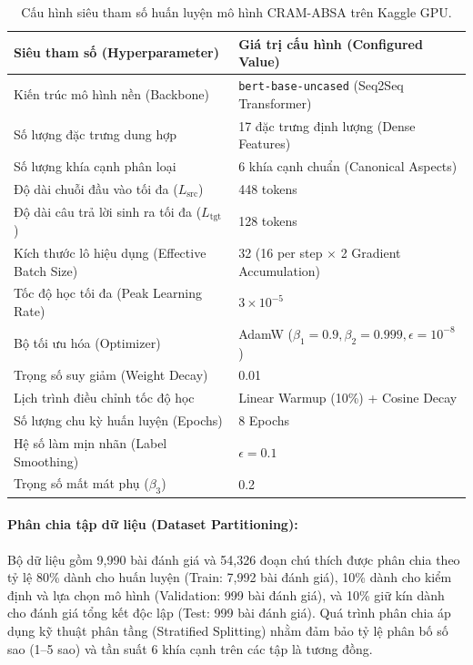 \documentclass[pdflatex,sn-mathphys-num]{sn-jnl}
\theoremstyle{thmstyleone}
\theoremstyle{thmstyletwo}
\theoremstyle{thmstylethree}
\begin{document}
\begin{table}[htbp]
\centering
\caption{Cấu hình siêu tham số huấn luyện mô hình CRAM-ABSA trên Kaggle GPU.}
\label{tab:hyperparameters}
\begin{tabular}{p{}p{}}
\hline
\textbf{Siêu tham số (Hyperparameter)} & \textbf{Giá trị cấu hình (Configured Value)} \\
\hline
Kiến trúc mô hình nền (Backbone) & \texttt{bert-base-uncased} (Seq2Seq Transformer) \\
Số lượng đặc trưng dung hợp & 17 đặc trưng định lượng (Dense Features) \\
Số lượng khía cạnh phân loại & 6 khía cạnh chuẩn (Canonical Aspects) \\
Độ dài chuỗi đầu vào tối đa ($L_{\text{src}}$) & 448 tokens \\
Độ dài câu trả lời sinh ra tối đa ($L_{\text{tgt}}$) & 128 tokens \\
Kích thước lô hiệu dụng (Effective Batch Size) & 32 (16 per step $\times$ 2 Gradient Accumulation) \\
Tốc độ học tối đa (Peak Learning Rate) & $3 \times 10^{-5}$ \\
Bộ tối ưu hóa (Optimizer) & AdamW ($\beta_1=0.9, \beta_2=0.999, \epsilon=10^{-8}$) \\
Trọng số suy giảm (Weight Decay) & 0.01 \\
Lịch trình điều chỉnh tốc độ học & Linear Warmup (10\%) + Cosine Decay \\
Số lượng chu kỳ huấn luyện (Epochs) & 8 Epochs \\
Hệ số làm mịn nhãn (Label Smoothing) & $\epsilon = 0.1$ \\
Trọng số mất mát phụ ($\beta_3$) & 0.2 \\
\hline
\end{tabular}
\end{table}

\paragraph{Phân chia tập dữ liệu (Dataset Partitioning):}
Bộ dữ liệu gồm 9,990 bài đánh giá và 54,326 đoạn chú thích được phân chia theo tỷ lệ 80\% dành cho huấn luyện (Train: 7,992 bài đánh giá), 10\% dành cho kiểm định và lựa chọn mô hình (Validation: 999 bài đánh giá), và 10\% giữ kín dành cho đánh giá tổng kết độc lập (Test: 999 bài đánh giá). Quá trình phân chia áp dụng kỹ thuật phân tầng (Stratified Splitting) nhằm đảm bảo tỷ lệ phân bố số sao (1--5 sao) và tần suất 6 khía cạnh trên các tập là tương đồng.
\end{document}
